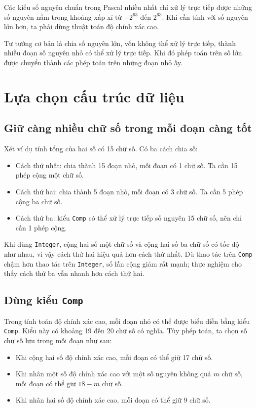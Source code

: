 \documentclass[11pt]{article}
\begin{document}
Các kiểu số nguyên chuẩn trong Pascal nhiều nhất chỉ xử lý trực tiếp được
những số nguyên nằm trong khoảng xấp xỉ từ \(-2^{63}\) đến \(2^{63}\). Khi
cần tính với số nguyên lớn hơn, ta phải dùng thuật toán độ chính xác cao.

Tư tưởng cơ bản là chia số nguyên lớn, vốn không thể xử lý trực tiếp, thành
nhiều đoạn số nguyên nhỏ có thể xử lý trực tiếp. Khi đó phép toán trên số lớn
được chuyển thành các phép toán trên những đoạn nhỏ ấy.

\section{Lựa chọn cấu trúc dữ liệu}

\subsection{Giữ càng nhiều chữ số trong mỗi đoạn càng tốt}

Xét ví dụ tính tổng của hai số có 15 chữ số. Có ba cách chia số:
\begin{itemize}
  \item Cách thứ nhất: chia thành 15 đoạn nhỏ, mỗi đoạn có 1 chữ số. Ta cần
  15 phép cộng một chữ số.
  \item Cách thứ hai: chia thành 5 đoạn nhỏ, mỗi đoạn có 3 chữ số. Ta cần 5
  phép cộng ba chữ số.
  \item Cách thứ ba: kiểu \texttt{Comp} có thể xử lý trực tiếp số nguyên 15
  chữ số, nên chỉ cần 1 phép cộng.
\end{itemize}

Khi dùng \texttt{Integer}, cộng hai số một chữ số và cộng hai số ba chữ số có
tốc độ như nhau, vì vậy cách thứ hai hiệu quả hơn cách thứ nhất. Dù thao tác
trên \texttt{Comp} chậm hơn thao tác trên \texttt{Integer}, số lần cộng giảm
rất mạnh; thực nghiệm cho thấy cách thứ ba vẫn nhanh hơn cách thứ hai.

\subsection{Dùng kiểu \texttt{Comp}}

Trong tính toán độ chính xác cao, mỗi đoạn nhỏ có thể được biểu diễn bằng
kiểu \texttt{Comp}. Kiểu này có khoảng 19 đến 20 chữ số có nghĩa. Tùy phép
toán, ta chọn số chữ số lưu trong mỗi đoạn như sau:
\begin{itemize}
  \item Khi cộng hai số độ chính xác cao, mỗi đoạn có thể giữ 17 chữ số.
  \item Khi nhân một số độ chính xác cao với một số nguyên không quá \(m\)
  chữ số, mỗi đoạn có thể giữ \(18-m\) chữ số.
  \item Khi nhân hai số độ chính xác cao, mỗi đoạn có thể giữ 9 chữ số.
\end{itemize}
\end{document}
